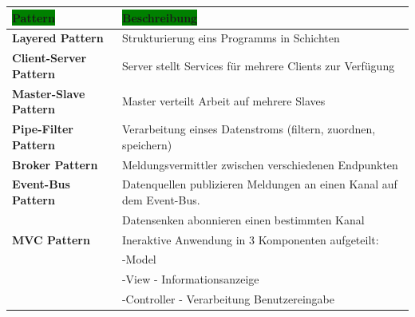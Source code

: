 \documentclass[../ZF_SWEN1.tex]{subfiles}
\begin{document}
\begin{table} [H]

\begin{tabular}{l|l}

\colorbox{green}{\textbf{Pattern}} & \colorbox{green}{\textbf{Beschreibung}}

\\\hline
\textbf{Layered Pattern} & Strukturierung eins Programms in Schichten\\
\hline
\textbf{Client-Server Pattern} & Server stellt Services für mehrere Clients zur Verfügung\\
\hline
\textbf{Master-Slave Pattern} & Master verteilt Arbeit auf mehrere Slaves\\
\hline
\textbf{Pipe-Filter Pattern} & Verarbeitung einses Datenstroms (filtern, zuordnen, speichern)\\
\hline
\textbf{Broker Pattern} & Meldungsvermittler zwischen verschiedenen Endpunkten \\
\hline
\textbf{Event-Bus Pattern} & Datenquellen publizieren Meldungen an einen Kanal auf dem Event-Bus.\\ &Datensenken abonnieren einen bestimmten Kanal\\
\hline
\textbf{MVC Pattern} & Ineraktive Anwendung in 3 Komponenten aufgeteilt:\\
& -Model \\
& -View - Informationsanzeige \\
& -Controller - Verarbeitung Benutzereingabe
\end{tabular}
\end{table}
\end{document}
